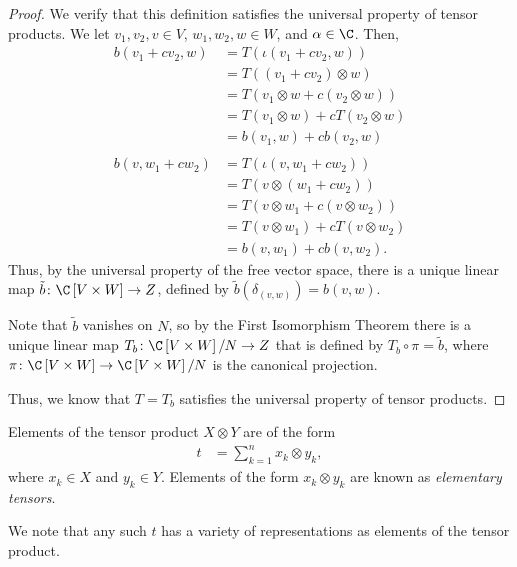 \begin{proof}
  We verify that this definition satisfies the universal property of tensor products. We let $v_1,v_2,v\in V$, $w_1,w_2,w\in W$, and $\alpha\in \C$. Then,
  \begin{align*}
    b\left( v_1 + cv_2,w \right) &= T\left( \iota\left( v_1 + cv_2,w \right) \right)\\
                                 &= T\left( \left( v_1 + cv_2 \right)\otimes w \right)\\
                                 &= T\left( v_1\otimes w + c\left( v_2\otimes w \right) \right)\\
                                 &= T\left( v_1\otimes w \right) + cT\left( v_2\otimes w \right)\\
                                 &= b\left( v_1,w \right) + cb\left( v_2,w \right)\\
                                 \\
    b\left( v,w_1 + cw_2 \right) &= T\left( \iota\left( v,w_1 + cw_2 \right) \right)\\
                                 &= T\left( v\otimes \left( w_1 + cw_2 \right) \right)\\
                                 &= T\left( v\otimes w_1 + c\left( v\otimes w_2 \right) \right)\\
                                 &= T\left( v\otimes w_1 \right) + cT\left( v\otimes w_2 \right)\\
                                 &= b\left( v,w_1 \right) + cb\left( v,w_2 \right).
  \end{align*}
  Thus, by the universal property of the free vector space, there is a unique linear map $\tilde{b}\colon \C\left[ V\times W \right]\rightarrow Z$, defined by $\tilde{b}\left( \delta_{(v,w)} \right) = b\left( v,w \right)$.\newline

  Note that $\tilde{b}$ vanishes on $N$, so by the First Isomorphism Theorem there is a unique linear map $T_{b}\colon \C\left[ V\times W \right]/N\rightarrow Z$ that is defined by $T_{b} \circ \pi = \tilde{b}$, where $\pi\colon \C\left[ V\times W \right] \rightarrow \C\left[ V\times W \right]/N$ is the canonical projection.\newline

  Thus, we know that $T = T_{b}$ satisfies the universal property of tensor products.
\end{proof}
\begin{remark}
  Elements of the tensor product $X\otimes Y$ are of the form
  \begin{align*}
    t &= \sum_{k=1}^{n}x_k\otimes y_k,
  \end{align*}
  where $x_k\in X$ and $y_k\in Y$. Elements of the form $x_k\otimes y_k$ are known as \textit{elementary tensors}.\newline

  We note that any such $t$ has a variety of representations as elements of the tensor product.
\end{remark}
